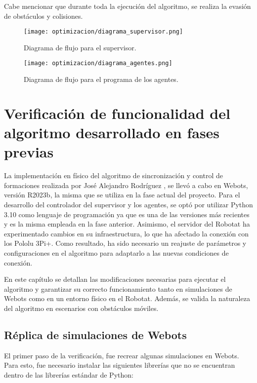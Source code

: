 Cabe mencionar que durante toda la ejecución del algoritmo, se realiza la evasión de obstáculos y colisiones.

\begin{figure}[H]
	\centering
	\texttt{[image: optimizacion/diagrama\_supervisor.png]}
	\caption{Diagrama de flujo para el supervisor.}
	\label{fig:diagrama_supervisor}
\end{figure}

\begin{figure}[H]
	\centering
	\texttt{[image: optimizacion/diagrama\_agentes.png]}
	\caption{Diagrama de flujo para el programa de los agentes.}
	\label{fig:diagrama_agentes}
\end{figure}


\chapter{Verificación de funcionalidad del algoritmo desarrollado en fases previas}\label{cap:restauracion}

La implementación en físico del algoritmo de sincronización y control de formaciones realizada por José Alejandro Rodríguez \cite{RodriguezJA_2023_tesis}, se llevó a cabo en Webots, versión R2023b, la misma que se utiliza en la fase actual del proyecto. Para el desarrollo del controlador del supervisor y los agentes, se optó por utilizar Python 3.10 como lenguaje de programación ya que es una de las versiones más recientes y es la misma empleada en la fase anterior. Asimismo, el servidor del Robotat ha experimentado cambios en su infraestructura, lo que ha afectado la conexión con los Pololu 3Pi+. Como resultado, ha sido necesario un reajuste de parámetros y configuraciones en el algoritmo para adaptarlo a las nuevas condiciones de conexión.

En este capítulo se detallan las modificaciones necesarias para ejecutar el algoritmo y garantizar su correcto funcionamiento tanto en simulaciones de Webots como en un entorno físico en el Robotat. Además, se valida la naturaleza del algoritmo en escenarios con obstáculos móviles.


\section{Réplica de simulaciones de Webots}
El primer paso de la verificación, fue recrear algunas simulaciones en Webots. Para esto, fue necesario instalar las siguientes librerías que no se encuentran dentro de las librerías estándar de Python:

